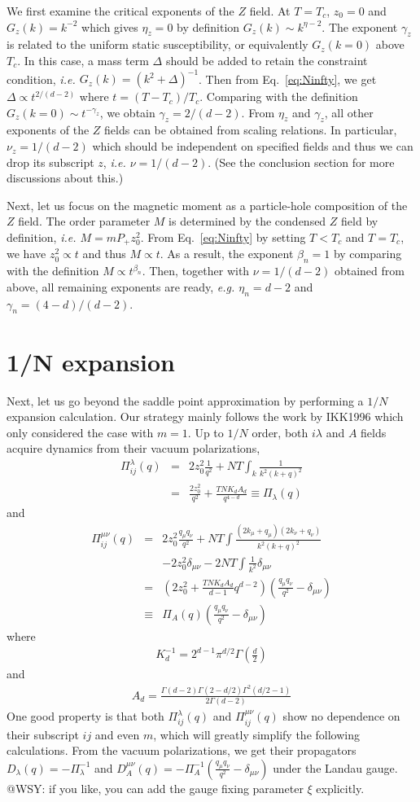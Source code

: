 \documentclass[aps,twocolumn,superscriptaddress]{revtex4-1}
\newcommand{\bea}{\begin{eqnarray}}
\newcommand{\eea}{\end{eqnarray}}
\newcommand{\ie}{\textit{i.e.{ }}}
\newcommand{\eg}{\textit{e.g.{ }}}
\begin{document}
We first examine the critical exponents of the $Z$ field. At $T=T_c$, $z_0=0$ and $G_z(k)=k^{-2}$ which gives $\eta_z=0$ by definition $G_z(k)\sim k^{\eta-2}$. The exponent $\gamma_z$ is related to the uniform static susceptibility, or equivalently $G_z(k=0)$ above $T_c$. In this case, a mass term $\Delta$ should be added to retain the constraint condition, \ie $G_z(k)=(k^2+\Delta)^{-1}$. Then from Eq.~\ref{eq:Ninfty}, we get $\Delta\propto t^{2/(d-2)}$ where $t=(T-T_c)/T_c$. Comparing with the definition $G_z(k=0)\sim t^{-\gamma_z}$, we obtain $\gamma_z=2/(d-2)$. From $\eta_z$ and $\gamma_z$, all other exponents of the $Z$ fields can be obtained from scaling relations. In particular, $\nu_z=1/(d-2)$ which should be independent on specified fields and thus we can drop its subscript $z$, \ie $\nu=1/(d-2)$. (See the conclusion section for more discussions about this.)

Next, let us focus on the magnetic moment as a particle-hole composition of the $Z$ field. The order parameter $M$ is determined by the condensed $Z$ field by definition, \ie $M=mP_+z_0^2$. From Eq.~\ref{eq:Ninfty} by setting $T<T_c$ and $T=T_c$, we have $z_0^2\propto t$ and thus $M\propto t$. As a result, the exponent $\beta_n=1$ by comparing with the definition $M\propto t^{\beta_n}$. Then, together with $\nu=1/(d-2)$ obtained from above, all remaining exponents are ready, \eg $\eta_n=d-2$ and $\gamma_n=(4-d)/(d-2)$. 


\section{1/N expansion}
Next, let us go beyond the saddle point approximation by performing a $1/N$ expansion calculation. Our strategy mainly follows the work by IKK1996 which only considered the case with $m=1$. Up to $1/N$ order, both $i\lambda$ and $A$ fields acquire dynamics from their vacuum polarizations,
\bea \Pi_{ij}^\lambda(q)&=&2z_0^2\frac{1}{q^2} + NT\int_k \frac{1}{k^2(k+q)^2} \nonumber\\ &=&\frac{2z_0^2}{q^2}+\frac{TNK_dA_d}{q^{4-d}} \equiv \Pi_\lambda(q) \eea 
and 
\bea \Pi_{ij}^{\mu\nu}(q) &=& 2z_0^2 \frac{q_\mu q_\nu}{q^2} + NT\int \frac{(2k_\mu+q_\mu)(2k_\nu+q_\nu)}{k^2(k+q)^2} \nonumber\\ && - 2z_0^2 \delta_{\mu\nu} -2NT\int \frac{1}{k^2}\delta_{\mu\nu}  \nonumber\\ &=&\left(2z_0^2+\frac{TNK_dA_d}{d-1} q^{d-2}\right)\left(\frac{q_\mu q_\nu}{q^2}-\delta_{\mu\nu}\right) \nonumber\\
&\equiv& \Pi_A(q)\left(\frac{q_\mu q_\nu}{q^2}-\delta_{\mu\nu}\right) \eea
where 
\bea K_d^{-1}=2^{d-1}\pi^{d/2}\Gamma\left(\frac{d}{2}\right) \eea
and
\bea A_d=\frac{\Gamma(d-2)\Gamma(2-d/2)\Gamma^2(d/2-1)}{2\Gamma(d-2)} \eea
One good property is that both $\Pi_{ij}^\lambda(q)$ and $\Pi_{ij}^{\mu\nu}(q)$ show no dependence on their subscript $ij$ and even $m$, which will greatly simplify the following calculations. From the vacuum polarizations, we get their propagators $D_\lambda(q)=-\Pi_\lambda^{-1}$ and
$D_A^{\mu\nu}(q)=-\Pi_A^{-1}\left(\frac{q_\mu q_\nu}{q^2}-\delta_{\mu\nu}\right)$ under the Landau gauge. {\color{red} @WSY: if you like, you can add the gauge fixing parameter $\xi$ explicitly.}
\end{document}

